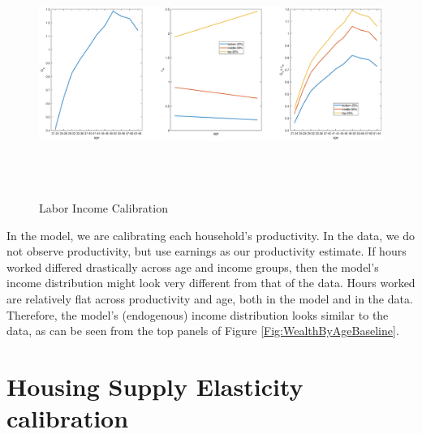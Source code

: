 \documentclass[letterpaper,12pt,dvipsnames,usenames]{article}
\theoremstyle{definition}
\begin{document}
\begin{spacing}{1.0}
\begin{small}
\begin{figure}\caption{Labor Income Calibration}\label{fig:G}
\vspace{-0.5cm}
\begin{center}
\includegraphics[width=18cm,height=8cm]{../Figures/IncomeProc.eps}
\end{center}
\end{figure}


In the model, we are calibrating each household's productivity. In the data, we do not observe productivity, but use earnings as our productivity estimate. If hours worked differed drastically across age and income groups, then the model's income distribution might look very different from that of the data. Hours worked are relatively flat across productivity and age, both in the model and in the data. Therefore, the model's (endogenous) income distribution looks similar to the data, as can be seen from the top panels of Figure \ref{Fig:WealthByAgeBaseline}.


\section{Housing Supply Elasticity calibration} \label{app:HSE}


\end{small}
\end{spacing}
\end{document}
